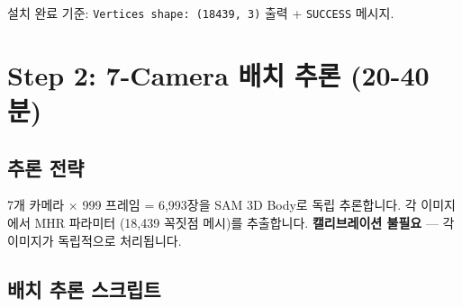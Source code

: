 \documentclass[11pt, a4paper]{report}
\begin{document}
\begin{successbox}
설치 완료 기준: \texttt{Vertices shape: (18439, 3)} 출력 + \texttt{SUCCESS} 메시지.
\end{successbox}


\chapter{Step 2: 7-Camera 배치 추론 (20-40분)}

\section{추론 전략}

\begin{keyidea}
7개 카메라 $\times$ 999 프레임 = 6,993장을 SAM 3D Body로 독립 추론합니다.
각 이미지에서 MHR 파라미터 (18,439 꼭짓점 메시)를 추출합니다.
\textbf{캘리브레이션 불필요} --- 각 이미지가 독립적으로 처리됩니다.
\end{keyidea}

\section{배치 추론 스크립트}
\end{document}
